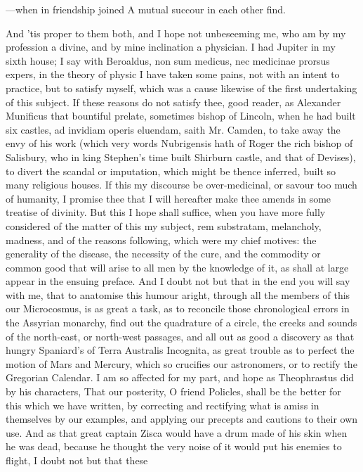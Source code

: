 {---when in friendship joined
A mutual succour in each other find.

And 'tis proper to them both, and I hope not unbeseeming me, who am by
my profession a divine, and by mine inclination a physician. I had
Jupiter in my sixth house; I say with Beroaldus, non sum medicus,
nec medicinae prorsus expers, in the theory of physic I have taken some
pains, not with an intent to practice, but to satisfy myself, which was
a cause likewise of the first undertaking of this subject.
If these reasons do not satisfy thee, good reader, as Alexander
Munificus that bountiful prelate, sometimes bishop of Lincoln, when he
had built six castles, ad invidiam operis eluendam, saith Mr.
Camden, to take away the envy of his work (which very words Nubrigensis
hath of Roger the rich bishop of Salisbury, who in king Stephen's time
built Shirburn castle, and that of Devises), to divert the scandal or
imputation, which might be thence inferred, built so many religious
houses. If this my discourse be over-medicinal, or savour too much of
humanity, I promise thee that I will hereafter make thee amends in some
treatise of divinity. But this I hope shall suffice, when you have more
fully considered of the matter of this my subject, rem substratam,
melancholy, madness, and of the reasons following, which were my chief
motives: the generality of the disease, the necessity of the cure, and
the commodity or common good that will arise to all men by the
knowledge of it, as shall at large appear in the ensuing preface. And I
doubt not but that in the end you will say with me, that to anatomise
this humour aright, through all the members of this our Microcosmus, is
as great a task, as to reconcile those chronological errors in the
Assyrian monarchy, find out the quadrature of a circle, the creeks and
sounds of the north-east, or north-west passages, and all out as good a
discovery as that hungry Spaniard's of Terra Australis Incognita,
as great trouble as to perfect the motion of Mars and Mercury, which so
crucifies our astronomers, or to rectify the Gregorian Calendar. I am
so affected for my part, and hope as Theophrastus did by his
characters, That our posterity, O friend Policles, shall be the better
for this which we have written, by correcting and rectifying what is
amiss in themselves by our examples, and applying our precepts and
cautions to their own use. And as that great captain Zisca would have a
drum made of his skin when he was dead, because he thought the very
noise of it would put his enemies to flight, I doubt not but that these
}
